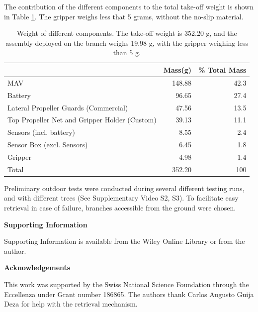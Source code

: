 The contribution of the different components to the total take-off weight is shown in Table \ref{tab:weight}. The gripper weighs less that 5 grams, without the no-slip material. 

\begin{table}
    \centering
    \caption{Weight of different components. The take-off weight is 352.20 g, and the assembly deployed on the branch weighs 19.98 g, with the gripper weighing less than 5 g.}
      \begin{tabular}[htbp]{@{}lrr@{}}
          & Mass(g) & \% Total Mass \\
        \hline
        MAV & 148.88 & 42.3 \\ 
        Battery & 96.65 & 27.4\\
        Lateral Propeller Guards (Commercial) & 47.56 & 13.5\\ 
        Top Propeller Net and Gripper Holder (Custom) & 39.13 & 11.1\\
        Sensors (incl. battery) & 8.55 & 2.4\\
        Sensor Box (excl. Sensors) & 6.45 & 1.8\\
        Gripper & 4.98 & 1.4\\
        \hline
        Total & 352.20 & 100
        
    \end{tabular}
    \label{tab:weight}
\end{table}
Preliminary outdoor tests were conducted during several different testing runs, and with different trees (See Supplementary Video S2, S3). To facilitate easy retrieval in case of failure, branches accessible from the ground were chosen.


\medskip
\textbf{Supporting Information} \par %
Supporting Information is available from the Wiley Online Library or from the author.



\medskip
\textbf{Acknowledgements} \par %
This work was supported by the Swiss National Science Foundation through the Eccellenza under Grant number 186865. The authors thank Carlos Augusto Guija Deza for help with the retrieval mechanism.

